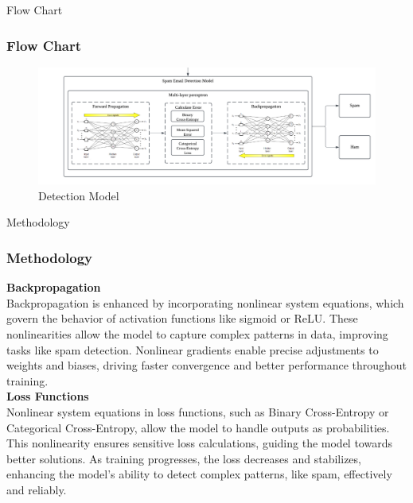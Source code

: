 \documentclass[aspectratio=1610]{beamer}
\begin{document}
\begin{frame}{Flow Chart}
    \frametitle{Flow Chart}
        \begin{figure}
        \centering
        \includegraphics[width = 1.1\linewidth]{NA (1)[1]}
        \caption{Detection Model}
        \label{fig:enter-label}
    \end{figure}
      
\end{frame}

\begin{frame}{Methodology}
    \frametitle{Methodology}
    \textbf{Backpropagation}\\
    \vspace{0.3cm}
    Backpropagation is enhanced by incorporating nonlinear system equations, which govern the behavior of activation functions like sigmoid or ReLU. These nonlinearities allow the model to capture complex patterns in data, improving tasks like spam detection. Nonlinear gradients enable precise adjustments to weights and biases, driving faster convergence and better performance throughout training.\\
    \vspace{0.5cm}
    \textbf{Loss Functions}\\
    \vspace{0.3cm}
    Nonlinear system equations in loss functions, such as Binary Cross-Entropy or Categorical Cross-Entropy, allow the model to handle outputs as probabilities. This nonlinearity ensures sensitive loss calculations, guiding the model towards better solutions. As training progresses, the loss decreases and stabilizes, enhancing the model’s ability to detect complex patterns, like spam, effectively and reliably.

\end{frame}
\end{document}
